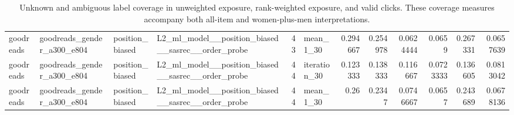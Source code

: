 \begin{table}[htbp!]
\begin{tabular}{llllrlrrrrrr}
goodreads & goodreads\_gender\_a300\_e804 & position\_biased & L2\_ml\_model\_\_position\_biased\_\_sasrec\_\_order\_probe & 43 & mean\_1\_30 & 0.294667 & 0.254978 & 0.0624444 & 0.0659 & 0.267331 & 0.0657639 \\
goodreads & goodreads\_gender\_a300\_e804 & position\_biased & L2\_ml\_model\_\_position\_biased\_\_sasrec\_\_order\_probe & 44 & iteration\_30 & 0.123333 & 0.138333 & 0.116667 & 0.0723333 & 0.136605 & 0.0813042 \\
goodreads & goodreads\_gender\_a300\_e804 & position\_biased & L2\_ml\_model\_\_position\_biased\_\_sasrec\_\_order\_probe & 44 & mean\_1\_30 & 0.26 & 0.2347 & 0.0746667 & 0.0657 & 0.243689 & 0.0678136 \\
\hline
\end{tabular}
\caption{Unknown and ambiguous label coverage in unweighted exposure, rank-weighted exposure, and valid clicks. These coverage measures accompany both all-item and women-plus-men interpretations.}
\label{chap:results:tab:rq7_unresolved_label_coverage_summaries}
\end{table}
